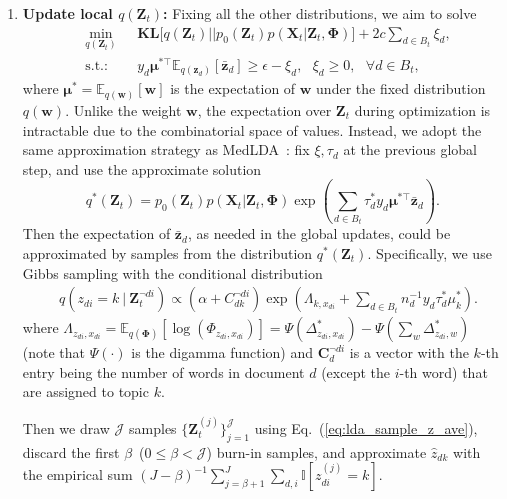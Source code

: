 \documentclass[twoside,11pt]{article}
\newcommand{\Xv}{\bm{X}}
\newcommand{\zv}{\bm{z}}
\newcommand{\Zv}{\bm{Z}}
\newcommand{\wv}{\bm{w}}
\newcommand{\Phiv}{\bm{\Phi}}
\newcommand{\muv}{\bm \mu}
\newcommand{\ep}{\mathbb{E}}
\newcommand{\KL}{\textbf{KL}}
\newcommand{\barzv}{\bm{\bar{z}}}
\newcommand{\subto}{\text{s.t.:}}
\newcommand{\ind}{\mathbb{I}}
\newcommand\refeq[1]{(\ref{#1})}
\begin{document}
\begin{enumerate}
\item \textbf{Update local $q(\Zv_t)$:} Fixing all the other distributions, we aim to solve
\setlength\arraycolsep{0 pt}\begin{eqnarray*}
&\underset{q(\Zv_t)}{\operatorname{min}}~~~ & \KL\Big[q(\Zv_t) || p_0(\Zv_t) p(\Xv_t | \Zv_t, \Phiv)\Big] + 2c \sum\limits_{d \in B_t}{\xi_d}, \\
&\subto & y_d \muv^{*\top} \ep_{q(\zv_d)}[\barzv_d] \geq \epsilon-\xi_d, ~~~ \xi_d \geq 0, ~~~\forall d \in B_t,
\end{eqnarray*}
where $\muv^* = \ep_{q(\wv)}[\wv]$ is the expectation of $\wv$ under the fixed distribution $q(\wv)$. Unlike the weight $\wv$, the expectation over $\Zv_t$ during optimization is intractable due to the combinatorial space of values. Instead, we adopt the same approximation strategy as MedLDA~\citep{zhu2012medlda}: fix $\xi, \tau_d$ at the previous global step, and use the approximate solution
\begin{equation*}
q^*(\Zv_t) = p_0(\Zv_t) p(\Xv_t | \Zv_t, \Phiv) \exp\left( \sum\limits_{d \in B_t}{\tau_d^* y_d \muv^{*\top} \barzv_d} \right).
\end{equation*}
Then the expectation of $\barzv_d$, as needed in the global updates, could be approximated by samples from the distribution $q^*(\Zv_t)$. Specifically, we use Gibbs sampling with the conditional distribution
\begin{equation}\label{eq:lda_sample_z_ave}
\begin{array}{rl}
&q(z_{di} =  k ~|~ \Zv_t^{\neg di}) \propto  \left( \alpha + C_{dk}^{\neg di} \right)
\exp\left( \Lambda_{k,x_{di}} +\sum\limits_{d \in B_t}{n_d^{-1} y_d \tau_d^* \mu^*_k} \right).
\end{array}
\end{equation}
where $\Lambda_{z_{di}, x_{di}} = \ep_{q(\Phiv)}[\log(\Phi_{z_{di}, x_{di}})] = \Psi(\Delta_{z_{di}, x_{di}}^*)-\Psi(\sum_{w}{\Delta_{z_{di}, w}^*})$ (note that $\Psi(\cdot)$ is the digamma function) and $\bm{C}_d^{\neg di}$ is a vector with the $k$-th entry being the number of words in document $d$ (except the $i$-th word) that are assigned to topic $k$.


Then we draw $\mathcal{J}$ samples $\{\Zv_t^{(j)}\}_{j=1}^{\mathcal{J}}$ using Eq.~\refeq{eq:lda_sample_z_ave}, discard the first $\beta$~($0 \leq \beta < \mathcal{J}$) burn-in samples, and approximate $\widehat{z}_{dk}$ with the empirical sum  $(J-\beta)^{-1} \sum_{j = \beta+1}^{J}{\sum_{d, i} \ind[z_{di}^{(j)} = k]}$.
\end{enumerate}
\end{document}
